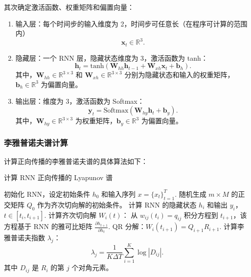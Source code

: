 其次确定激活函数、权重矩阵和偏置向量：

\begin{enumerate}

  \item 输入层：每个时间步的输入维度为 2，时间步可任意长（在程序可计算的范围内）
        \begin{equation}
          \mathbf{x}_t \in \mathbb{R}^{3}.
        \end{equation}

  \item 隐藏层：一个 RNN 层，隐藏状态维度为 3，激活函数为 tanh：
        \begin{equation}
          \mathbf{h}_t = \text{tanh}(\mathbf{W}_{hh} \mathbf{h}_{t-1} + \mathbf{W}_{xh} \mathbf{x}_t + \mathbf{b}_h).
        \end{equation}
        其中，\(\mathbf{W}_{hh} \in \mathbb{R}^{3 \times 3}\) 和 \(\mathbf{W}_{xh} \in \mathbb{R}^{3 \times 3}\) 分别为隐藏状态和输入的权重矩阵，\(\mathbf{b}_h \in \mathbb{R}^{3}\) 为偏置向量。

  \item 输出层：维度为 3，激活函数为 Softmax：
        \begin{equation}
          \mathbf{y}_t = \text{Softmax}(\mathbf{W}_{hy} \mathbf{h}_t + \mathbf{b}_y).
        \end{equation}
        其中，\(\mathbf{W}_{hy} \in \mathbb{R}^{3 \times 3}\) 为权重矩阵，\(\mathbf{b}_y \in \mathbb{R}^{3}\) 为偏置向量。

\end{enumerate}

\subsubsection{李雅普诺夫谱计算}

计算正向传播的李雅普诺夫谱的具体算法如下：

\begin{algorithm}[H]
  \caption{计算 RNN 正向传播的 Lyapunov 谱}
  \begin{algorithmic}[1]
  \STATE 初始化 RNN，设定初始条件 $h_0$ 和输入序列 $x = \{x_t\}_{t=1}^T$.
  \STATE 随机生成 $m \times M$ 的正交矩阵 $Q_0$ 作为齐次切向解的初始条件。
      \STATE 计算 RNN 的隐藏状态 $h_i$ 和输出 $y_i$，$t \in [t_i, t_{i+1}]$.
      \STATE 计算齐次切向解 $W_i(t)$：
          \STATE 从 $w_{ij}(t_i) = q_{ij}$ 积分方程到 $t_{i+1}$，该方程基于 RNN 的雅可比矩阵 $\frac{\partial h_{t+1}}{\partial h_t}$.
      \ENDFOR
      \STATE QR 分解：$W_i(t_{i+1}) = Q_{i+1} R_{i+1}$.
  \ENDFOR
  \STATE 计算李雅普诺夫指数 $\lambda_j$：
  \begin{equation}
  \lambda_j = \frac{1}{K \Delta T} \sum_{i=1}^K \log |D_{ij}|.
  \end{equation}
  其中 $D_{ij}$ 是 $R_i$ 的第 $j$ 个对角元素。
  \end{algorithmic}
\end{algorithm}


